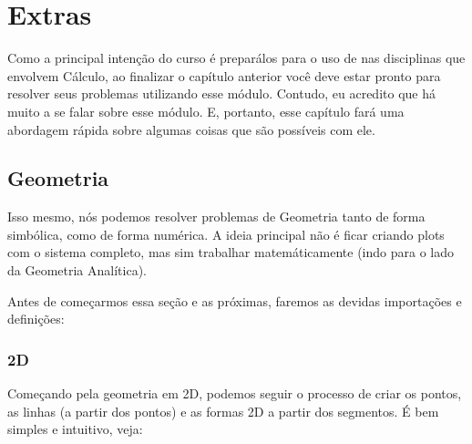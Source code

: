 \documentclass[letterpaper,10pt,english]{jupyterBook}
\begin{document}
\chapter{Extras}
\label{\detokenize{chapters/6:extras}}\label{\detokenize{chapters/6::doc}}
\sphinxAtStartPar
Como a principal intenção do curso é prepará\sphinxhyphen{}los para o uso de  nas disciplinas que envolvem Cálculo, ao finalizar o capítulo anterior você deve estar pronto para resolver seus problemas utilizando esse módulo. Contudo, eu acredito que há muito a se falar sobre esse módulo. E, portanto, esse capítulo fará uma abordagem rápida sobre algumas coisas que são possíveis com ele.


\section{Geometria}
\label{\detokenize{chapters/6:geometria}}
\sphinxAtStartPar
Isso mesmo, nós podemos resolver problemas de Geometria tanto de forma simbólica, como de forma numérica. A ideia principal não é ficar criando plots com o sistema completo, mas sim trabalhar matemáticamente (indo para o lado da Geometria Analítica).

\sphinxAtStartPar
Antes de começarmos essa seção e as próximas, faremos as devidas importações e definições:

\begin{sphinxVerbatim}[commandchars=\\\{\}]
   
    
    
 
\end{sphinxVerbatim}


\subsection{2D}
\label{\detokenize{chapters/6:d}}
\sphinxAtStartPar
Começando pela geometria em 2D, podemos seguir o processo de criar os pontos, as linhas (a partir dos pontos) e as formas 2D a partir dos segmentos. É bem simples e intuitivo, veja:
\end{document}
